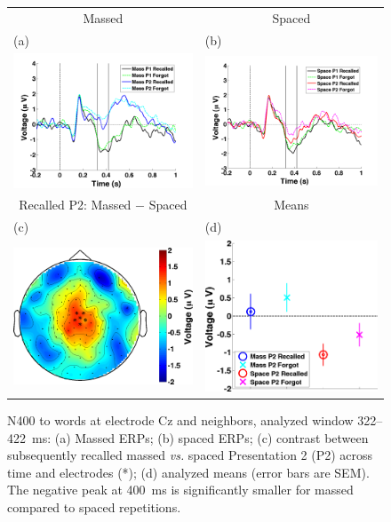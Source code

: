 \begin{figure}[hp]
  \centering
  \begin{tabular}{cc}
  Massed & Spaced \\
  \multicolumn{1}{l}{(a)} & \multicolumn{1}{l}{(b)} \\
  \includegraphics[width=.35\textwidth]{./figs/exp1/tla_single_ga_word_RgH_rc_mass_p1_word_RgH_fo_mass_p1_word_RgH_rc_mass_p2_word_RgH_fo_mass_p2_C_-200_1000_legend_xylabel} &
  \includegraphics[width=.35\textwidth]{./figs/exp1/tla_single_ga_word_RgH_rc_spac_p1_word_RgH_fo_spac_p1_word_RgH_rc_spac_p2_word_RgH_fo_spac_p2_C_-200_1000_legend_xylabel} \\
  Recalled P2: Massed $-$ Spaced & Means \\
  \multicolumn{1}{l}{(c)} & \multicolumn{1}{l}{(d)} \\
  \includegraphics[width=.29\textwidth]{./figs/exp1/tla_topocont_ga_word_RgH_rc_mass_p2vsword_RgH_rc_spac_p2_C_322_422_-2p0_2p0_cb} &
  \includegraphics[width=.30\textwidth]{./figs/exp1/tla_line_ga_word_RgH_rc_mass_p2_word_RgH_fo_mass_p2_word_RgH_rc_spac_p2_word_RgH_fo_spac_p2_C_322_422_ylabel} \\
  \end{tabular}
  \caption{N400 to words at electrode Cz and neighbors, analyzed window 322--422~ms: (a) Massed ERPs; (b) spaced ERPs; (c) contrast between subsequently recalled massed \textit{vs.} spaced Presentation 2 (P2) across time and electrodes (*); (d) analyzed means (error bars are SEM).  The negative peak at 400~ms is significantly smaller for massed compared to spaced repetitions.}
  \label{fig:N400}
\end{figure}

